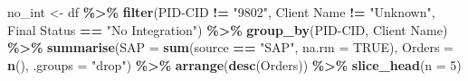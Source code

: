 \documentclass[
]{article}
\newenvironment{Shaded}{\begin{snugshade}}{\end{snugshade}}
\newcommand{\AttributeTok}[1]{\textcolor[rgb]{0.13,0.29,0.53}{#1}}
\newcommand{\ConstantTok}[1]{\textcolor[rgb]{0.56,0.35,0.01}{#1}}
\newcommand{\DecValTok}[1]{\textcolor[rgb]{0.00,0.00,0.81}{#1}}
\newcommand{\FunctionTok}[1]{\textcolor[rgb]{0.13,0.29,0.53}{\textbf{#1}}}
\newcommand{\NormalTok}[1]{#1}
\newcommand{\OtherTok}[1]{\textcolor[rgb]{0.56,0.35,0.01}{#1}}
\newcommand{\SpecialCharTok}[1]{\textcolor[rgb]{0.81,0.36,0.00}{\textbf{#1}}}
\newcommand{\StringTok}[1]{\textcolor[rgb]{0.31,0.60,0.02}{#1}}
\begin{document}
\begin{Shaded}
\begin{Highlighting}[]
\NormalTok{      no\_int }\OtherTok{\textless{}{-}}\NormalTok{ df }\SpecialCharTok{\%\textgreater{}\%}
        \FunctionTok{filter}\NormalTok{(}\StringTok{\textasciigrave{}}\AttributeTok{PID{-}CID}\StringTok{\textasciigrave{}} \SpecialCharTok{!=} \StringTok{"9802"}\NormalTok{, }\StringTok{\textasciigrave{}}\AttributeTok{Client Name}\StringTok{\textasciigrave{}} \SpecialCharTok{!=} \StringTok{"Unknown"}\NormalTok{, }\StringTok{\textasciigrave{}}\AttributeTok{Final Status}\StringTok{\textasciigrave{}} \SpecialCharTok{==} \StringTok{"No Integration"}\NormalTok{) }\SpecialCharTok{\%\textgreater{}\%}
        \FunctionTok{group\_by}\NormalTok{(}\StringTok{\textasciigrave{}}\AttributeTok{PID{-}CID}\StringTok{\textasciigrave{}}\NormalTok{, }\StringTok{\textasciigrave{}}\AttributeTok{Client Name}\StringTok{\textasciigrave{}}\NormalTok{) }\SpecialCharTok{\%\textgreater{}\%}
        \FunctionTok{summarise}\NormalTok{(}\AttributeTok{SAP =} \FunctionTok{sum}\NormalTok{(source }\SpecialCharTok{==} \StringTok{"SAP"}\NormalTok{, }\AttributeTok{na.rm =} \ConstantTok{TRUE}\NormalTok{), }\AttributeTok{Orders =} \FunctionTok{n}\NormalTok{(), }\AttributeTok{.groups =} \StringTok{"drop"}\NormalTok{) }\SpecialCharTok{\%\textgreater{}\%}
        \FunctionTok{arrange}\NormalTok{(}\FunctionTok{desc}\NormalTok{(Orders)) }\SpecialCharTok{\%\textgreater{}\%} \FunctionTok{slice\_head}\NormalTok{(}\AttributeTok{n =} \DecValTok{5}\NormalTok{)}
      

\end{Highlighting}
\end{Shaded}
\end{document}
